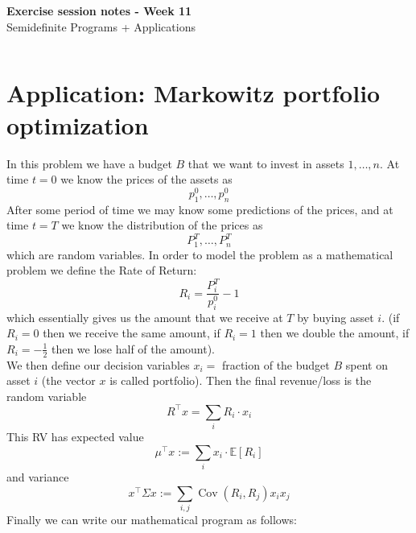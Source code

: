 \documentclass[answers]{exam}
\begin{document}
	$ $
	\begin{center}
		\huge \textbf{Exercise session notes - Week 11}  \\ \vspace*{3mm}
        \Large{Semidefinite Programs + Applications}
	\end{center}
	$ $\\

    \section{Application: Markowitz portfolio optimization}

    In this problem we have a budget $B$ that we want to invest in assets $1,\ldots, n$. At time $t = 0$ we know the prices of the assets as
    $$ p_1^0,\ldots , p_n^0 $$
    After some period of time we may know some predictions of the prices, and at time $t = T$ we know the distribution of the prices as 
    $$ P_1^T,\ldots , P_n^T $$
    which are random variables. In order to model the problem as a mathematical problem we define the Rate of Return:
    $$ R_i = \frac{P_i^T}{p_i^0} - 1 $$
    which essentially gives us the amount that we receive at $T$ by buying asset $i$. (if $R_i = 0$ then we receive the same amount, if $R_i = 1$ then we double the amount, if $R_i = -\tfrac{1}{2}$ then we lose half of the amount). \\ 
    We then define our decision variables $x_i = $ fraction of the budget $B$ spent on asset $i$ (the vector $x$ is called portfolio). Then the final revenue/loss is the random variable 
    $$ R^\top x = \sum_{i} R_i \cdot x_i $$
    This RV has expected value 
    $$ \mu^\top x := \sum_{i} x_i\cdot  \mathbb{E}[R_i]  $$
    and variance 
    $$ x^\top \Sigma x := \sum_{i,j} \operatorname*{Cov}(R_i, R_j)x_ix_j $$
    Finally we can write our mathematical program as follows: 
\end{document}
